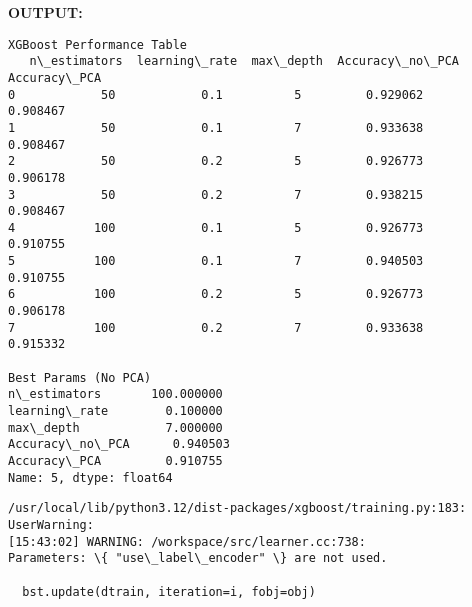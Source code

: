 \documentclass[11pt]{article}
\begin{document}
\vspace{0.8cm}
\textbf{OUTPUT:}
    \begin{Verbatim}[commandchars=\\\{\}]
XGBoost Performance Table
   n\_estimators  learning\_rate  max\_depth  Accuracy\_no\_PCA  Accuracy\_PCA
0            50            0.1          5         0.929062      0.908467
1            50            0.1          7         0.933638      0.908467
2            50            0.2          5         0.926773      0.906178
3            50            0.2          7         0.938215      0.908467
4           100            0.1          5         0.926773      0.910755
5           100            0.1          7         0.940503      0.910755
6           100            0.2          5         0.926773      0.906178
7           100            0.2          7         0.933638      0.915332

Best Params (No PCA)
n\_estimators       100.000000
learning\_rate        0.100000
max\_depth            7.000000
Accuracy\_no\_PCA      0.940503
Accuracy\_PCA         0.910755
Name: 5, dtype: float64
    \end{Verbatim}

    \begin{Verbatim}[commandchars=\\\{\}]
/usr/local/lib/python3.12/dist-packages/xgboost/training.py:183: UserWarning:
[15:43:02] WARNING: /workspace/src/learner.cc:738:
Parameters: \{ "use\_label\_encoder" \} are not used.

  bst.update(dtrain, iteration=i, fobj=obj)
    \end{Verbatim}

    \begin{center}
    \end{center}
    { \hspace*{\fill} \\}
    
\end{document}
